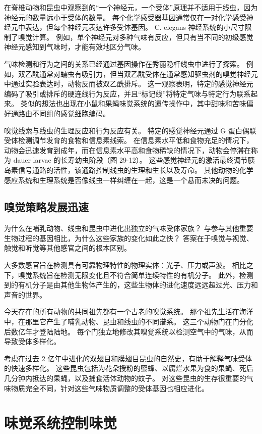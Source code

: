 在脊椎动物和昆虫中观察到的“一个神经元，一个受体”原理并不适用于线虫，因为神经元的数量远小于受体的数量。 每个化学感受器基因通常仅在一对化学感受神经元中表达，但每个神经元表达许多受体基因。 C. elegans 神经系统的小尺寸限制了嗅觉计算。 例如，单个神经元对多种气味有反应，但只有当不同的初级感觉神经元感知到气味时，才能有效地区分气味。

气味检测和行为之间的关系已经通过基因操作在秀丽隐杆线虫中进行了探索。 例如，双乙酰通常对蠕虫有吸引力，但当双乙酰受体在通常感知驱虫剂的嗅觉神经元中通过实验表达时，动物反而被双乙酰排斥。 这一观察表明，特定的感觉神经元编码了吸引或排斥的硬连线行为反应，并且“标记线”将特定气味与特定行为联系起来。 类似的想法也出现在小鼠和果蝇味觉系统的遗传操作中，其中甜味和苦味偏好通路由不同组的感觉细胞编码。

嗅觉线索与线虫的生理反应和行为反应有关。 特定的感觉神经元通过 G 蛋白偶联受体检测调节发育的食物和信息素线索。 在信息素水平低和食物充足的情况下，动物会迅速发育到成年，而在信息素水平高和食物稀缺的情况下，动物会停滞在称为 dauer larvae 的长寿幼虫阶段（图 29-12）。 这些感觉神经元的激活最终调节胰岛素信号通路的活性，该通路控制线虫的生理和生长以及寿命。 其他动物的化学感应系统和生理系统是否像线虫一样纠缠在一起，这是一个悬而未决的问题。

\subsection{嗅觉策略发展迅速}
为什么在哺乳动物、线虫和昆虫中进化出独立的气味受体家族？ 与参与其他重要生物过程的基因相比，为什么这些家族的变化如此之快？ 答案在于嗅觉与视觉、触觉和听觉等其他感官之间的根本区别。

大多数感官旨在检测具有可靠物理特性的物理实体：光子、压力或声波。 相比之下，嗅觉系统旨在检测无限变化且不符合简单连续特性的有机分子。 此外，检测到的有机分子是由其他生物体产生的，这些生物体的进化速度远远超过光、压力和声音的世界。

今天存在的所有动物的共同祖先都有一个古老的嗅觉系统。 那个祖先生活在海洋中，在那里它产生了哺乳动物、昆虫和线虫的不同谱系。 这三个动物门在门分化后数亿年才登陆陆地。 每个门独立地修改其嗅觉系统以检测空气中的气味，从而导致受体多样化。

考虑在过去 2 亿年中进化的双翅目和膜翅目昆虫的自然史，有助于解释气味受体的快速多样化。 这些昆虫包括为花朵授粉的蜜蜂、以腐烂水果为食的果蝇、死后几分钟内抵达的果蝇，以及捕食活体动物的蚊子。 对这些昆虫的生存很重要的气味物质完全不同，针对这些气味物质调整的受体基因也相应进化。


\section{味觉系统控制味觉}
